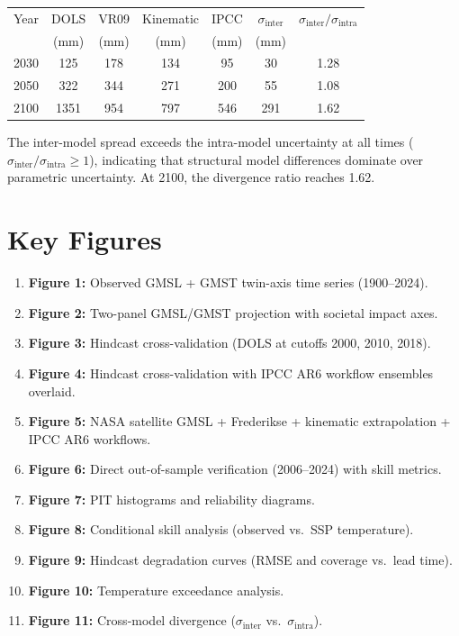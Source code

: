 \documentclass[11pt]{article}
\begin{document}
\begin{center}
\begin{tabular}{lcccccc}
\toprule
Year & DOLS & VR09 & Kinematic & IPCC & $\sigma_{\mathrm{inter}}$ & $\sigma_{\mathrm{inter}}/\sigma_{\mathrm{intra}}$ \\
     & (mm) & (mm) & (mm)      & (mm) & (mm) & \\
\midrule
2030 &  125 &  178 &  134 &   95 &  30 & 1.28 \\
2050 &  322 &  344 &  271 &  200 &  55 & 1.08 \\
2100 & 1351 &  954 &  797 &  546 & 291 & 1.62 \\
\bottomrule
\end{tabular}
\end{center}

The inter-model spread exceeds the intra-model uncertainty at all times ($\sigma_{\mathrm{inter}}/\sigma_{\mathrm{intra}} \geq 1$), indicating that structural model differences dominate over parametric uncertainty.  At 2100, the divergence ratio reaches 1.62.

\section{Key Figures}

\begin{enumerate}
    \item \textbf{Figure 1:} Observed GMSL + GMST twin-axis time series (1900--2024).
    \item \textbf{Figure 2:} Two-panel GMSL/GMST projection with societal impact axes.
    \item \textbf{Figure 3:} Hindcast cross-validation (DOLS at cutoffs 2000, 2010, 2018).
    \item \textbf{Figure 4:} Hindcast cross-validation with IPCC AR6 workflow ensembles overlaid.
    \item \textbf{Figure 5:} NASA satellite GMSL + Frederikse + kinematic extrapolation + IPCC AR6 workflows.
    \item \textbf{Figure 6:} Direct out-of-sample verification (2006--2024) with skill metrics.
    \item \textbf{Figure 7:} PIT histograms and reliability diagrams.
    \item \textbf{Figure 8:} Conditional skill analysis (observed vs.\ SSP temperature).
    \item \textbf{Figure 9:} Hindcast degradation curves (RMSE and coverage vs.\ lead time).
    \item \textbf{Figure 10:} Temperature exceedance analysis.
    \item \textbf{Figure 11:} Cross-model divergence ($\sigma_{\mathrm{inter}}$ vs.\ $\sigma_{\mathrm{intra}}$).
\end{enumerate}
\end{document}
